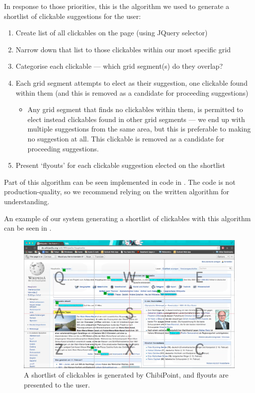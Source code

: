 \documentclass[11pt,openright,a4paper]{report}
\begin{document}
In response to those priorities, this is the algorithm we used to generate a shortlist of clickable suggestions for the user:
\begin{enumerate}
\item Create list of all clickables on the page (using JQuery selector)
\item Narrow down that list to those clickables within our most specific grid
\item Categorise each clickable --- which grid segment(s) do they overlap?
\item Each grid segment attempts to elect as their suggestion, one clickable found within them (and this is removed as a candidate for proceeding suggestions)
	\begin{itemize}
		\item Any grid segment that finds no clickables within them, is permitted to elect instead clickables found in other grid segments --- we end up with multiple suggestions from the same area, but this is preferable to making no suggestion at all. This clickable is removed as a candidate for proceeding suggestions.
	\end{itemize}
\item Present `flyouts' for each clickable suggestion elected on the shortlist
\end{enumerate}

Part of this algorithm can be seen implemented in code in . The code is not production-quality, so we recommend relying on the written algorithm for understanding.

An example of our system generating a shortlist of clickables with this algorithm can be seen in .


\begin{figure}[ht]
\centering\includegraphics[width=\textwidth]{figures/FlyoutsOriginal.png}
\caption{A shortlist of clickables is generated by ChibiPoint, and flyouts are presented to the user.}
\label{fig:origClickable}
\end{figure}
\FloatBarrier
\end{document}
